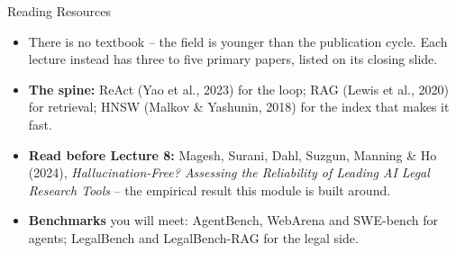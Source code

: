 \begin{frame}{Reading Resources}
\begin{itemize}
  \item There is no textbook -- the field is younger than the publication cycle. Each lecture instead has three to five primary papers, listed on its closing slide.
  \pause
  \item \textbf{The spine:} ReAct (Yao et al., 2023) for the loop; RAG (Lewis et al., 2020) for retrieval; HNSW (Malkov \& Yashunin, 2018) for the index that makes it fast.
  \pause
  \item \textbf{Read before Lecture 8:} Magesh, Surani, Dahl, Suzgun, Manning \& Ho (2024), \textit{Hallucination-Free? Assessing the Reliability of Leading AI Legal Research Tools} -- the empirical result this module is built around.
  \pause
  \item \textbf{Benchmarks} you will meet: AgentBench, WebArena and SWE-bench for agents; LegalBench and LegalBench-RAG for the legal side.
\end{itemize}
\end{frame}
